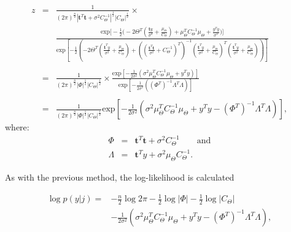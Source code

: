 {\setlength\arraycolsep{2pt}
\begin{eqnarray}\label{eq:z25}
z &=& \frac{1}{(2\pi)^{\frac{n}{2}} |\textbf{t}^T\textbf{t}+\sigma^2C_\Theta^{-1}|^{\frac{1}{2}} |C_\Theta|^{\frac{1}{2}}} \times {}\\\nonumber
& &\frac{\textrm{exp}\Bigg[-\frac{1}{2}\Bigg(- 2 \Theta^T\left(\frac{\textbf{t}y}{\sigma^2} + \frac{\mu_\Theta}{C_\Theta}\right) +  \mu_\Theta^TC_\Theta^{-1}\mu_\Theta + \frac{y^Ty}{\sigma^2}\Bigg)\Bigg]}{\textrm{exp}\left[-\frac{1}{2}\left(- 2\Theta^T\left(\frac{\textbf{t}^Ty}{\sigma^2} + \frac{\mu_\Theta}{C_\Theta}\right)  + \left(\left(\frac{\textbf{t}^T\textbf{t}}{\sigma^2} + C_\Theta^{-1}\right)^T\right)^{-1}\left(\frac{\textbf{t}^Ty}{\sigma^2} + \frac{\mu_\Theta}{C_\Theta}\right)^T\left(\frac{\textbf{t}^Ty}{\sigma^2} + \frac{\mu_\Theta}{C_\Theta}\right) \right)\right]}\\\nonumber{}\\\nonumber
&=& \frac{1}{(2\pi)^{\frac{n}{2}} |\Phi|^{\frac{1}{2}} |C_\Theta|^{\frac{1}{2}}}\times \frac{\textrm{exp}\left[-\frac{1}{2\sigma^2}\left(\sigma^2\mu_\Theta^TC_\Theta^{-1}\mu_\Theta + y^Ty\right)\right]}{\textrm{exp}\left[-\frac{1}{2\sigma^2}\left(\left(\Phi^T\right)^{-1}\Lambda^T\Lambda \right)\right]}\\\nonumber{}\\\nonumber
&=& \frac{1}{(2\pi)^{\frac{n}{2}} |\Phi|^{\frac{1}{2}}|C_\Theta|^{\frac{1}{2}}} \textrm{exp}\left[-\frac{1}{2\sigma^2}\left(\sigma^2\mu_\Theta^TC_\Theta^{-1}\mu_\Theta + y^Ty- \left(\Phi^T\right)^{-1}\Lambda^T\Lambda\right)\right],
\end{eqnarray}}
where:
\begin{eqnarray}
\label{eq:z3}
\Phi &=& \textbf{t}^T\textbf{t} + \sigma^2C_\Theta^{-1} \qquad \textrm{and}\\\nonumber
\Lambda &=& \textbf{t}^Ty + \sigma^2\mu_\Theta C_\Theta^{-1}.
\end{eqnarray}

As with the previous method, the log-likelihood is calculated

\begin{equation}\begin{split}\label{eq:loglikeli}
\log{p(y|j)} = &- \frac{n}{2}\log{2 \pi}- \frac{1}{2}\log{|\Phi|} - \frac{1}{2}\log{|C_\Theta|} \\
&- \frac{1}{2\sigma^2}\left(\sigma^2\mu_\Theta^TC_\Theta^{-1}\mu_\Theta + y^Ty- \left(\Phi^T\right)^{-1}\Lambda^T\Lambda\right),
\end{split}\end{equation}

